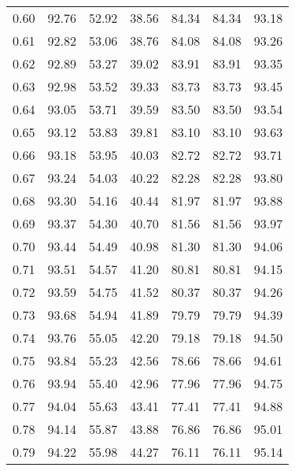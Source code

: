 \begin{tabular}{|c|c|c|c|c|c|c|}
      0.60 &     92.76 &     52.92 &      38.56 &   84.34 &      84.34 &         93.18 \\
      0.61 &     92.82 &     53.06 &      38.76 &   84.08 &      84.08 &         93.26 \\
      0.62 &     92.89 &     53.27 &      39.02 &   83.91 &      83.91 &         93.35 \\
      0.63 &     92.98 &     53.52 &      39.33 &   83.73 &      83.73 &         93.45 \\
      0.64 &     93.05 &     53.71 &      39.59 &   83.50 &      83.50 &         93.54 \\
      0.65 &     93.12 &     53.83 &      39.81 &   83.10 &      83.10 &         93.63 \\
      0.66 &     93.18 &     53.95 &      40.03 &   82.72 &      82.72 &         93.71 \\
      0.67 &     93.24 &     54.03 &      40.22 &   82.28 &      82.28 &         93.80 \\
      0.68 &     93.30 &     54.16 &      40.44 &   81.97 &      81.97 &         93.88 \\
      0.69 &     93.37 &     54.30 &      40.70 &   81.56 &      81.56 &         93.97 \\
      0.70 &     93.44 &     54.49 &      40.98 &   81.30 &      81.30 &         94.06 \\
      0.71 &     93.51 &     54.57 &      41.20 &   80.81 &      80.81 &         94.15 \\
      0.72 &     93.59 &     54.75 &      41.52 &   80.37 &      80.37 &         94.26 \\
      0.73 &     93.68 &     54.94 &      41.89 &   79.79 &      79.79 &         94.39 \\
      0.74 &     93.76 &     55.05 &      42.20 &   79.18 &      79.18 &         94.50 \\
      0.75 &     93.84 &     55.23 &      42.56 &   78.66 &      78.66 &         94.61 \\
      0.76 &     93.94 &     55.40 &      42.96 &   77.96 &      77.96 &         94.75 \\
      0.77 &     94.04 &     55.63 &      43.41 &   77.41 &      77.41 &         94.88 \\
      0.78 &     94.14 &     55.87 &      43.88 &   76.86 &      76.86 &         95.01 \\
      0.79 &     94.22 &     55.98 &      44.27 &   76.11 &      76.11 &         95.14 \\

\end{tabular}
